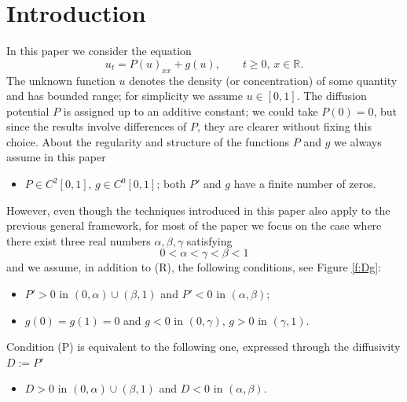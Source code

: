 \documentclass[11pt,a4paper]{article}
\newcommand{\R}{\mathbb R}
\begin{document}
\section{Introduction}
\label{sec:intro}
In this paper we consider the equation
\begin{equation}\label{e:E}
u_t =P(u)_{xx} + g(u), \qquad t\ge 0, \, x\in \R.
\end{equation}
The unknown function $u$ denotes the density (or concentration) of some quantity and has bounded range; for simplicity we assume $u\in[0,1]$. The diffusion potential $P$ is assigned up to an additive constant; we could take $P(0)=0$, but since the results involve differences of $P$, they are clearer without fixing this choice. About the regularity and structure of the functions $P$ and $g$ we always assume in this paper
\begin{itemize}
\item[(R)] $P\in C^2[0,1]$, $g\in C^0[0,1]$; both $P'$ and $g$ have a finite number of zeros.
\end{itemize}
%
However, even though the techniques introduced in this paper also apply to the previous general framework, for most of the paper we focus on the case where there exist three real numbers $\alpha,\beta,\gamma$ satisfying
\begin{equation}\label{eq:condition}
0< \alpha < \gamma < \beta <1
\end{equation}
and we assume, in addition to (R), the following conditions, see Figure \ref{f:Dg}:
\begin{itemize}
\item[(P)] $P'>0$ in $(0,\alpha) \cup (\beta,1)$ and $P'<0$ in $(\alpha, \beta)$;

\item[{(g)}] $g(0)=g(1)=0$ and $g<0$ in $(0,\gamma)$, $g>0$ in $(\gamma,1)$.
\end{itemize}
%

\noindent Condition (P) is equivalent to the following one, expressed through the diffusivity $D:=P'$
\begin{itemize}
\item[]  $D>0$ in $(0,\alpha) \cup (\beta,1)$ and $D<0$ in $(\alpha, \beta)$.
\end{itemize}
\end{document}
